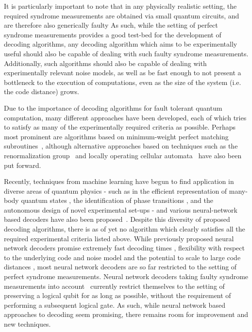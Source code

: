 \documentclass[twocolumn,preprintnumbers,amsmath,amssymb,notitlepage,nofootinbib,longbibliography,superscriptaddress,aps,pra,10pt]{revtex4-1}
\begin{document}
	It is particularly important to note that in any physically realistic setting, the required syndrome measurements are obtained via small quantum circuits, and are therefore also generically faulty 
	As such, while the setting of perfect syndrome measurements provides a good test-bed for the development of decoding algorithms, any decoding algorithm which aims to be experimentally useful should also be capable of dealing with such faulty syndrome measurements.
	Additionally, such algorithms should also be capable of dealing with experimentally relevant noise models, as well as be fast enough to not present a bottleneck to the execution of computations, even as the size of the system (i.e. the code distance) grows.

	Due to the importance of decoding algorithms for fault tolerant quantum computation, many different approaches have been developed, each of which tries to satisfy as many of the experimentally required criteria as possible.
	Perhaps most prominent are algorithms based on minimum-weight perfect matching subroutines~\cite{Fowler13}, although alternative approaches based on techniques such as the renormalization group~\cite{Duclos2010} and locally operating cellular automata~\cite{Herold15,herold2017cellular,Kubica2018} have also been put forward.

	Recently, techniques from machine learning have begun to find application in diverse areas of quantum physics - such as in the efficient representation of many-body quantum states \cite{WFcarleo2017solving,WFcarleo2018constructing,WFgao2017efficient}, the identification of phase transitions \cite{PTvan2017learning,PTPhysRevB.97.134109,PTcarrasquilla2017machine}, and the autonomous design of novel experimental set-ups \cite{melnikov2018active} - and various neural-network based decoders have also been proposed~\cite{Torlai10, Varsamopoulos17, Krastanov17, Breuckmann18, Baireuther18a, Baireuther18b, Ni18, chamberland2018deep}.
	Despite this diversity of proposed decoding algorithms, there is as of yet no algorithm which clearly satisfies all the required experimental criteria listed above.
	While previously proposed neural network decoders promise extremely fast decoding times \cite{chamberland2018deep}, flexibility with respect to the underlying code and noise model \cite{chamberland2018deep, Breuckmann18} and the potential to scale to large code distances \cite{Ni18}, most neural network decoders are so far restricted to the setting of perfect syndrome measurements.
	Neural network decoders taking faulty syndrome measurements into account~\cite{Baireuther18a,Baireuther18b} currently restrict themselves to the setting of preserving a logical qubit for as long as possible, without the requirement of performing a subsequent logical gate.
	As such, while neural network based approaches to decoding seem promising, there remains room for improvement and new techniques.
\end{document}
